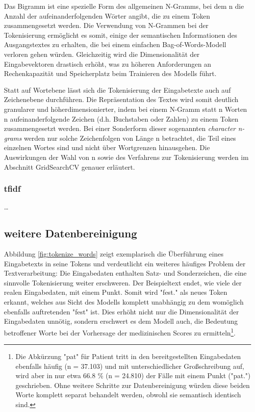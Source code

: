 Das Bigramm ist eine spezielle Form des allgemeinen N-Gramms, bei dem n die Anzahl der aufeinanderfolgenden Wörter angibt, die zu einem Token zusammengesetzt werden. Die Verwendung von N-Grammen bei der Tokenisierung ermöglicht es somit, einige der semantischen Informationen des Ausgangstextes zu erhalten, die bei einem einfachen Bag-of-Words-Modell verloren gehen würden. Gleichzeitig wird die Dimensionalität der Eingabevektoren drastisch erhöht, was zu höheren Anforderungen an Rechenkapazität und Speicherplatz beim Trainieren des Modells führt. 

Statt auf Wortebene lässt sich die Tokenisierung der Eingabetexte auch auf Zeichenebene durchführen. Die Repräsentation des Textes wird somit deutlich granularer und höherdimensionierter, indem bei einem N-Gramm statt n Worten n aufeinanderfolgende Zeichen (d.h. Buchstaben oder Zahlen) zu einem Token zusammengesetzt werden. Bei einer Sonderform dieser sogenannten \textit{character n-grams} werden nur solche Zeichenfolgen von Länge n betrachtet, die Teil eines einzelnen Wortes sind und nicht über Wortgrenzen hinausgehen. Die Auswirkungen der Wahl von n sowie des Verfahrens zur Tokenisierung werden im Abschnitt GridSearchCV genauer erläutert.

\subsubsection{tfidf}
\dots

\subsection{weitere Datenbereinigung}
Abbildung \ref{fig:tokenize_words} zeigt exemplarisch die Überführung eines Eingabetexts in seine Tokens und verdeutlicht ein weiteres häufiges Problem der Textverarbeitung: Die Eingabedaten enthalten Satz- und Sonderzeichen, die eine sinnvolle Tokenisierung weiter erschweren. Der Beispieltext endet, wie viele der realen Eingabedaten, mit einem Punkt. Somit wird "fest." als neues Token erkannt, welches aus Sicht des Modells komplett unabhängig zu dem womöglich ebenfalls auftretenden "fest" ist. Dies erhöht nicht nur die Dimensionalität der Eingabedaten unnötig, sondern erschwert es dem Modell auch, die Bedeutung betroffener Worte bei der Vorhersage der medizinischen Scores zu ermitteln\footnote{Die Abkürzung "pat" für Patient tritt in den bereitgestellten Eingabedaten ebenfalls häufig (n = 37.103) und mit unterschiedlicher Großschreibung auf, wird aber in nur etwa 66.8 \% (n = 24.810) der Fälle mit einem Punkt ("pat.") geschrieben. Ohne weitere Schritte zur Datenbereinigung würden diese beiden Worte komplett separat behandelt werden, obwohl sie semantisch identisch sind.}.


